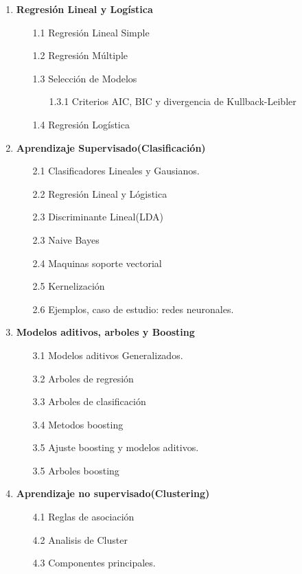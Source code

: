 \documentclass[11pt]{report}
\begin{document}
\begin{enumerate}
\item \textbf{Regresión Lineal y Logística} 
\begin{itemize}

\item[1.1] Regresión Lineal Simple 
\item[1.2] Regresión Múltiple 
\item[1.3] Selección de Modelos 
\begin{itemize}
\item[1.3.1] Criterios AIC, BIC y divergencia de Kullback-Leibler
\end{itemize}
\item[1.4] Regresión Logística   
\end{itemize}


\item  \textbf{Aprendizaje Supervisado(Clasificación)}
\begin{itemize}
\item[2.1] Clasificadores Lineales y Gausianos. 
\item[2.2] Regresión Lineal y Lógistica 
\item[2.3] Discriminante Lineal(LDA) 
\item[2.3] Naive Bayes
\item[2.4] Maquinas soporte vectorial
\item[2.5] Kernelización
\item[2.6] Ejemplos, caso de estudio: redes neuronales.
\end{itemize}


\item \textbf{Modelos aditivos, arboles y Boosting}
\begin{itemize}
\item[3.1] Modelos aditivos Generalizados.
\item[3.2] Arboles de regresión
\item[3.3] Arboles de clasificación
\item[3.4] Metodos boosting 
\item[3.5] Ajuste boosting y modelos aditivos. 
\item[3.5] Arboles boosting
\end{itemize}


\item  \textbf{Aprendizaje no supervisado(Clustering)}
\begin{itemize}
\item[4.1] Reglas de asociación
\item[4.2] Analisis de Cluster
\item[4.3] Componentes principales.
\end{itemize}





\end{enumerate}
\end{document}
